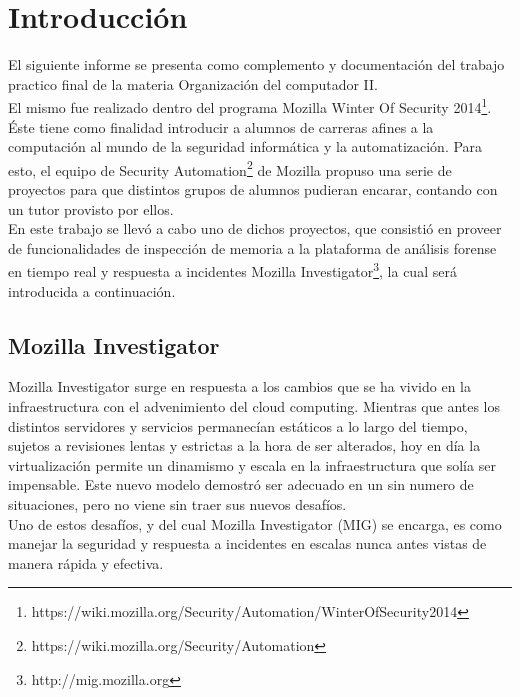 \section{Introducción}

El siguiente informe se presenta como complemento y documentación del trabajo
practico final de la materia Organización del computador II.\\

El mismo fue realizado dentro del programa Mozilla Winter Of Security
2014\footnote{https://wiki.mozilla.org/Security/Automation/WinterOfSecurity2014}.
Éste tiene como finalidad introducir a alumnos de carreras afines a la
computación al mundo de la seguridad informática y la automatización. Para
esto, el equipo de Security
Automation\footnote{https://wiki.mozilla.org/Security/Automation} de Mozilla
propuso una serie de proyectos para que distintos grupos de alumnos pudieran
encarar, contando con un tutor provisto por ellos.\\

En este trabajo se llevó a cabo uno de dichos proyectos, que consistió en
proveer de funcionalidades de inspección de memoria a la plataforma de análisis
forense en tiempo real y respuesta a incidentes Mozilla
Investigator\footnote{http://mig.mozilla.org}, la cual será introducida a
continuación.\\

\subsection{Mozilla Investigator}

Mozilla Investigator surge en respuesta a los cambios que se ha vivido en la
infraestructura con el advenimiento del cloud computing. Mientras que
antes los distintos servidores y servicios permanecían estáticos a lo largo del
tiempo, sujetos a revisiones lentas y estrictas a la hora de ser alterados, hoy
en día la virtualización permite un dinamismo y escala en la infraestructura
que solía ser impensable. Este nuevo modelo demostró ser adecuado en un sin
numero de situaciones, pero no viene sin traer sus nuevos desafíos.\\

Uno de estos desafíos, y del cual Mozilla Investigator (MIG) se encarga, es
como manejar la seguridad y respuesta a incidentes en escalas nunca antes
vistas de manera rápida y efectiva.\\

